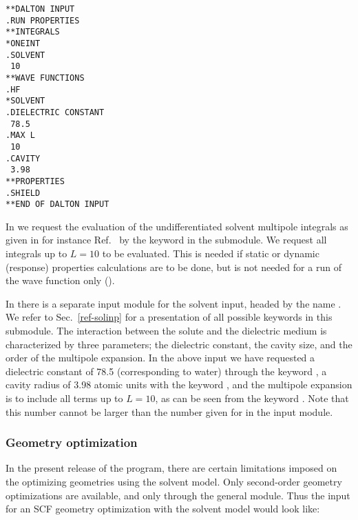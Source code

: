 \begin{verbatim}
**DALTON INPUT
.RUN PROPERTIES
**INTEGRALS
*ONEINT
.SOLVENT
 10
**WAVE FUNCTIONS
.HF
*SOLVENT
.DIELECTRIC CONSTANT
 78.5
.MAX L
 10
.CAVITY
 3.98
**PROPERTIES
.SHIELD
**END OF DALTON INPUT
\end{verbatim}

In  we request the evaluation of the undifferentiated solvent
multipole integrals as given in for instance
Ref.~\cite{kvmhahjajthjcp89} by the keyword  in the
 submodule. We request all
integrals up to $L=10$ to be evaluated. This is needed if static or
dynamic (response) properties
calculations are to be done, but is not needed for a run of the
wave function only ().

In  there is a separate input module for the
solvent input,
headed by the name . We refer to Sec.~\ref{ref-solinp}
for a presentation of all possible keywords in this submodule. The
interaction between the solute and the dielectric
medium is
characterized by three parameters; the dielectric
constant, the cavity
size, and the order of the multipole
expansion. In the above input we have
requested a dielectric constant of 78.5 (corresponding to water)
through the keyword , a cavity radius of 3.98 atomic
units with the keyword , and the multipole expansion is to
include all terms up to $L=10$, as can be seen from the keyword
. Note that this number cannot be larger than the number given for
 in the  input module.

\subsubsection{Geometry optimization}\label{sec:solventgeoopt}

In the present release of the {\dalton} program, there are certain
limitations imposed on the optimizing geometries using the solvent
model. Only second-order geometry optimizations
are available, and only through the general  module. 
Thus the input for an SCF geometry optimization with the solvent model
would look like:

